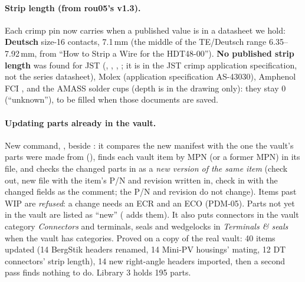 \paragraph{Strip length (from rou05's v1.3).} Each crimp pin now carries  when a published value is
in a datasheet we hold: \textbf{Deutsch} size-16 contacts, 7.1\,mm (the middle of the TE/Deutsch range
6.35--7.92\,mm, from ``How to Strip a Wire for the HDT48-00''). \textbf{No published strip length} was found for JST
(, , , ; it is in the JST crimp
application specification, not the series datasheet), Molex  (application specification
AS-43030), Amphenol FCI , and the AMASS solder cups (depth is in the drawing only): they stay
$0$ (``unknown''), to be filled when those documents are saved.

\paragraph{Updating parts already in the vault.} New command, , beside : it compares the
new manifest with the one the vault's parts were made from (), finds each vault item by MPN (or a
former MPN) in its file, and checks the changed parts in as a \emph{new version of the same item} (check out, new
file with the item's P/N and revision written in, check in with the changed fields as the comment; the P/N and
revision do not change). Items past WIP are \emph{refused}: a change needs an ECR and an ECO (PDM-05). Parts not
yet in the vault are listed as ``new'' ( adds them). It also puts connectors in the vault category
\emph{Connectors} and terminals, seals and wedgelocks in \emph{Terminals \& seals} when the vault has categories.
Proved on a copy of the real vault: 40 items updated (14 BergStik headers renamed, 14 Mini-PV housings' mating,
12 DT connectors' strip length), 14 new right-angle headers imported, then a second pass finds nothing to do.
Library 3 holds 195 parts.

